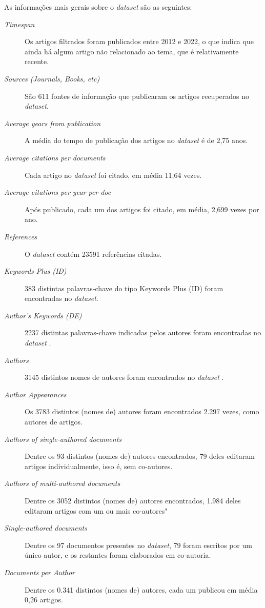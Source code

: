 As informações mais gerais sobre o \textit{dataset} são as seguintes:
\begin{description}
    \item [\textit{Timespan}] Os artigos filtrados foram publicados entre 2012 e 2022, o que indica que ainda há algum artigo não relacionado ao tema, que é relativamente recente.
    \item [\textit{Sources (Journals, Books, etc)}] São 611 fontes de informação que publicaram os artigos recuperados no \textit{dataset}.
    \item [\textit{Average years from publication}] A média do tempo de publicação dos artigos no \textit{dataset} é de 2,75 anos.
    \item [\textit{Average citations per documents}] Cada artigo no \textit{dataset} foi citado, em média 11,64 vezes.
    \item [\textit{Average citations per year per doc}] Após publicado, cada um dos artigos foi citado, em média, 2,699 vezes por ano.
    \item [\textit{References}] O \textit{dataset} contém 23591 referências citadas.
    \item [\textit{Keywords Plus (ID)}] 383 distintas palavras-chave do tipo Keywords Plus (ID) foram encontradas no \textit{dataset}.
    \item [\textit{Author's Keywords (DE)}] 2237 distintas palavras-chave indicadas pelos autores foram encontradas no \textit{dataset} .
    \item [\textit{Authors}] 3145 distintos nomes de autores foram encontrados no \textit{dataset} .
    \item [\textit{Author Appearances}] Os 3783 distintos (nomes de) autores foram encontrados 2.297 vezes, como autores de artigos.
    \item [\textit{Authors of single-authored documents}] Dentre os 93 distintos (nomes de) autores encontrados, 79 deles editaram artigos individualmente, isso é, sem co-autores.
    \item [\textit{Authors of multi-authored documents}] Dentre os 3052 distintos (nomes de) autores encontrados, 1.984 deles editaram artigos com um ou mais co-autores"
    \item [\textit{Single-authored documents}] Dentre os 97 documentos presentes no \textit{dataset}, 79 foram escritos por um único autor, e os restantes foram elaborados em co-autoria.
    \item [\textit{Documents per Author}] Dentre os 0.341 distintos (nomes de) autores, cada um publicou em média 0,26 artigos.

\end{description}
